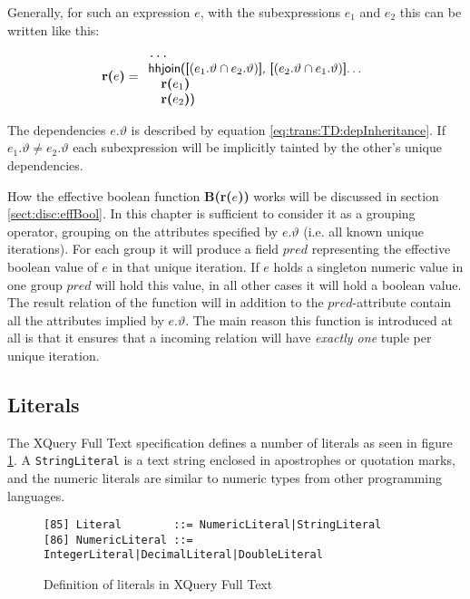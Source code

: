 Generally, for such an expression $e$, with the subexpressions $e_1$ and $e_2$ this can be written
like this:
\begin{equation*}
\mbox{\textbf{r(}}e\mbox{\textbf{)}}=
\begin{array}{l}
\mbox{\texttt{\ldots}} \\
\mbox{\textsf{hhjoin([}}(e_1.\vartheta\cap e_2.\vartheta)\mbox{\textsf{], [}}(e_2.\vartheta\cap e_1.\vartheta)
\mbox{\textsf{]\ldots}} \\ \quad
\mbox{\textbf{r(}}e_1\mbox{\textbf{)}} \\ \quad
\mbox{\textbf{r(}}e_2\mbox{\textbf{)}\textsf{)}}
\end{array}
\end{equation*}

The dependencies $e.\vartheta$ is described by equation \ref{eq:trans:TD:depInheritance}. If $e_{1}.\vartheta \neq
e_{2}.\vartheta$ each subexpression will be implicitly tainted by the other's unique dependencies.

How the effective boolean function \textbf{B(r(}$e$\textbf{))} works will be discussed in section
\ref{sect:disc:effBool}. In this chapter is sufficient to consider it as a grouping operator, grouping on the
attributes specified by $e.\vartheta$ (i.e. all known unique iterations). For each group it will produce a field
$pred$ representing the effective boolean value of $e$ in that unique iteration. If $e$ holds a singleton numeric
value in one group $pred$ will hold this value, in all other cases it will hold a boolean value. The result
relation of the function will in addition to the $pred$-attribute contain all the attributes implied by
$e.\vartheta$. The main reason this function is introduced at all is that it ensures that a incoming relation
will have \emph{exactly one} tuple per unique iteration.

\subsection{Literals}
\label{sect:trans:TD:literal}

The XQuery Full Text specification\cite{w3c01} defines a number of literals as seen in figure
\ref{fig:trans:TD:litEBNF}. A \texttt{StringLiteral} is a text string enclosed in apostrophes or quotation marks,
and the numeric literals are similar to numeric types from other programming languages. 

\begin{figure}[h]
\begin{Verbatim}
[85] Literal        ::= NumericLiteral|StringLiteral
[86] NumericLiteral ::= IntegerLiteral|DecimalLiteral|DoubleLiteral
\end{Verbatim}
\caption[Literals in XQuery]{Definition of literals in XQuery Full Text}
\label{fig:trans:TD:litEBNF}
\end{figure}

